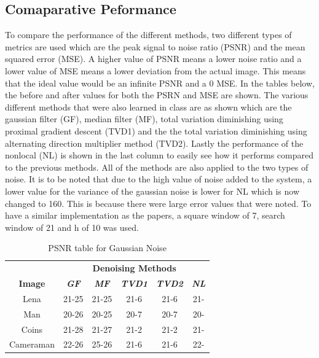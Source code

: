 \documentclass[conference]{IEEEtran}
\begin{document}
\subsection{Comaparative Peformance}
    To compare the performance of the different methods, two different types of metrics are used which are the peak signal to noise ratio (PSNR) and the mean squared error (MSE).
    A higher value of PSNR means a lower noise ratio and a lower value of MSE means a lower deviation from the actual image. This means that the ideal value would be an infinite PSNR 
    and a 0 MSE. In the tables below, the before and after values for both the PSRN and MSE are shown. The various different methods that were also learned in class are as shown which are 
    the gaussian filter (GF), median filter (MF), total variation diminishing using proximal gradient descent (TVD1) and the the total variation diminishing using alternating direction multiplier method (TVD2).
    Lastly the performance of the nonlocal (NL) is shown in the last column to easily see how it performs compared to the previous methods. 
    All of the methods are also applied to the two types of noise. It is to be noted that due to the high value of noise added to the system, a lower value for the variance of the gaussian noise is lower for NL
    which is now changed to 160. This is because there were large error values that were noted. To have a similar implementation as the papers, a square window of 7, search window of 21 and h of 10 was used. 

    \begin{table}[htbp]
    \caption{PSNR table for Gaussian Noise}
    \begin{center}
    \begin{tabular}{|c|c|c|c|c|c|}
    \hline
    \textbf{}&\multicolumn{5}{|c|}{\textbf{Denoising Methods}} \\
    \cline{2-6} 
    \textbf{Image} & \textbf{\textit{GF}}& \textbf{\textit{MF}}& \textbf{\textit{TVD1}} & \textbf{\textit{TVD2}} & \textbf{\textit{NL}} \\
    \hline
    Lena &21-25&21-25&21-6&21-6 & 21- \\
    \hline
    Man &20-26&20-25&20-7&20-7 &20-  \\
    \hline
    Coins &21-28&21-27&21-2&21-2 &21-  \\
    \hline
    Cameraman&22-26&25-26&21-6&21-6 &22-  \\
    \hline
    \end{tabular}
    \label{tab1}
    \end{center}
\end{table}
\end{document}
